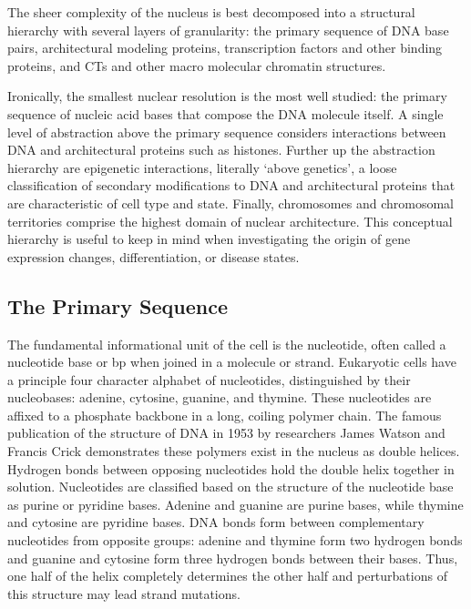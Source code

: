 The sheer complexity of the nucleus is best decomposed into a structural hierarchy with several layers of granularity: the primary
sequence of \gls{DNA} base pairs, architectural modeling proteins, transcription factors and other binding proteins, and \glspl{CT}
and other macro molecular chromatin structures.

Ironically, the smallest nuclear resolution is the most well studied: the primary sequence of nucleic acid bases that compose the \gls{DNA}
molecule itself.  A single level of abstraction above the primary sequence considers interactions between \gls{DNA} and  architectural
proteins such as histones.  Further up the abstraction hierarchy are \gls{epigenetic} interactions, literally `above genetics'\cite{dictepi2014},
a loose classification of secondary modifications to \gls{DNA} and architectural proteins that are characteristic of cell type and state.
Finally, chromosomes and chromosomal territories comprise the highest domain of nuclear architecture.  This conceptual hierarchy is useful
to keep in mind when investigating the origin of gene expression changes, differentiation, or disease states.

\subsection*{The Primary Sequence}

The fundamental informational unit of the cell is the \gls{nucleotide}, often called a nucleotide base or \gls{bp} when joined in a
molecule or strand.  Eukaryotic cells have a principle four character alphabet of nucleotides, distinguished by their \glspl{nucleobase}:
adenine, cytosine, guanine, and thymine.  These nucleotides are affixed to a phosphate backbone in a long, coiling polymer chain.  The
famous publication of the structure of \gls{DNA} in 1953 by researchers James Watson and Francis Crick demonstrates these polymers
exist in the nucleus as double helices\cite{watson1953}.  Hydrogen bonds between opposing nucleotides hold the double helix together in solution.
Nucleotides are classified based on the structure of the nucleotide base as purine or pyridine bases.  Adenine and guanine are purine bases,
while thymine and cytosine are pyridine bases.  \gls{DNA} bonds form between complementary nucleotides from opposite groups: adenine and thymine form
two hydrogen bonds and guanine and cytosine form three hydrogen bonds between their bases.  Thus, one half of the helix completely
determines the other half and perturbations of this structure may lead strand mutations\cite{cox2008}.

